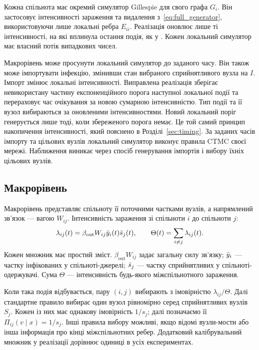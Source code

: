 Кожна спільнота має окремий симулятор Gillespie для свого графа $G_i$. Він застосовує інтенсивності зараження та видалення з~\eqref{eq:full_generator}, використовуючи лише локальні ребра $E_{ii}$. Реалізація оновлює лише ті інтенсивності, на які вплинула остання подія, як у \citet{kuryliak2025simulating}. Кожен локальний симулятор має власний потік випадкових чисел.

Макрорівень може просунути локальний симулятор до заданого часу. Він також може імпортувати інфекцію, змінивши стан вибраного сприйнятливого вузла на $I$. Імпорт змінює локальні інтенсивності. Виправлена реалізація зберігає невикористану частину експоненційного порога наступної локальної події та перераховує час очікування за новою сумарною інтенсивністю. Тип події та її вузол вибираються за оновленими інтенсивностями. Новий локальний поріг генерується лише тоді, коли збереженого порога немає. Це той самий принцип накопичення інтенсивності, який пояснено в Розділі~\ref{sec:timing}. За заданих часів імпорту та цільових вузлів локальний симулятор виконує правила CTMC своєї мережі. Наближення виникає через спосіб генерування імпортів і вибору їхніх цільових вузлів.

\subsection{Макрорівень}
\label{sec:macro}

Макрорівень представляє спільноту її поточними частками вузлів, а напрямлений зв'язок --- вагою $W_{ij}$. Інтенсивність зараження зі спільноти $i$ до спільноти $j$:
\begin{equation}
\label{eq:macro_rate}
\lambda_{ij}(t)=\beta_{\mathrm{out}}W_{ij}\bar{y}_i(t)\bar{s}_j(t),
\qquad \Theta(t)=\sum_{i\neq j}\lambda_{ij}(t).
\end{equation}
Кожен множник має простий зміст. $\beta_{\mathrm{out}}W_{ij}$ задає загальну силу зв'язку; $\bar{y}_i$ --- частку інфікованих у спільноті-джерелі; $\bar{s}_j$ --- частку сприйнятливих у спільноті-одержувачі. Сума $\Theta$ --- інтенсивність будь-якого міжспільнотного зараження.

Коли така подія відбувається, пару $(i,j)$ вибирають з імовірністю $\lambda_{ij}/\Theta$. Далі стандартне правило вибирає один вузол рівномірно серед сприйнятливих вузлів $S_j$. Кожен із них має однакову імовірність $1/s_j$; далі позначаємо її $\Pi_{ij}(v\mid x)=1/s_j$. Інші правила вибору можливі, якщо відомі вузли-мости або інша інформація про кінці міжспільнотних ребер. Додатковий калібрувальний множник у реалізації дорівнює одиниці в усіх експериментах.

